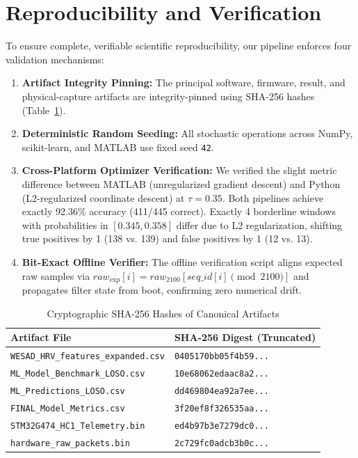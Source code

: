 \documentclass[conference]{IEEEtran}
\begin{document}
\section{Reproducibility and Verification}
\label{sec:reproducibility}

To ensure complete, verifiable scientific reproducibility, our pipeline enforces four validation mechanisms:
\begin{enumerate}
    \item \textbf{Artifact Integrity Pinning:} The principal software, firmware, result, and physical-capture artifacts are integrity-pinned using SHA-256 hashes (Table~\ref{tab:checksums}).
    \item \textbf{Deterministic Random Seeding:} All stochastic operations across NumPy, scikit-learn, and MATLAB use fixed seed \texttt{42}.
    \item \textbf{Cross-Platform Optimizer Verification:} We verified the slight metric difference between MATLAB (unregularized gradient descent) and Python (L2-regularized coordinate descent) at $\tau = 0.35$. Both pipelines achieve exactly 92.36\% accuracy (411/445 correct). Exactly 4 borderline windows with probabilities in $[0.345, 0.358]$ differ due to L2 regularization, shifting true positives by 1 (138 vs. 139) and false positives by 1 (12 vs. 13).
    \item \textbf{Bit-Exact Offline Verifier:} The offline verification script aligns expected raw samples via $raw_{\text{exp}}[i] = raw_{2100}[seq\_id[i] \pmod{2100}]$ and propagates filter state from boot, confirming zero numerical drift.
\end{enumerate}

\begin{table}[h]
\centering
\caption{Cryptographic SHA-256 Hashes of Canonical Artifacts}
\label{tab:checksums}
\footnotesize
\setlength{\tabcolsep}{2.5pt}
\begin{tabular}{@{}lp{3.6cm}@{}}
\toprule
\textbf{Artifact File} & \textbf{SHA-256 Digest (Truncated)} \\
\midrule
\texttt{WESAD\_HRV\_features\_expanded.csv} & \texttt{0405170bb05f4b59...} \\
\texttt{ML\_Model\_Benchmark\_LOSO.csv} & \texttt{10e68062edaac8a2...} \\
\texttt{ML\_Predictions\_LOSO.csv} & \texttt{dd469804ea92a7ee...} \\
\texttt{FINAL\_Model\_Metrics.csv} & \texttt{3f20ef8f326535aa...} \\
\texttt{STM32G474\_HC1\_Telemetry.bin} & \texttt{ed4b97b3e7279dc0...} \\
\texttt{hardware\_raw\_packets.bin} & \texttt{2c729fc0adcb3b0c...} \\
\bottomrule
\end{tabular}
\end{table}
\end{document}
